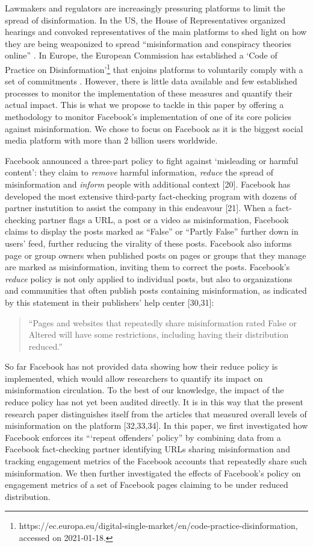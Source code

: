 \documentclass[11pt,a4paper]{article}
\begin{document}
Lawmakers and regulators are increasingly pressuring platforms to limit the spread of disinformation. In the US, the House of Representatives organized hearings and convoked representatives of the main platforms to shed light on how they are being weaponized to spread ``misinformation and conspiracy theories online'' \citep{donovan2020}. In Europe, the European Commission has established a `Code of Practice on Disinformation'\footnote{https://ec.europa.eu/digital-single-market/en/code-practice-disinformation, accessed on 2021-01-18.} that enjoins platforms to voluntarily comply with a set of commitments \citep{heldt2019let}. However, there is little data available and few established processes to monitor the implementation of these measures and quantify their actual impact. This is what we propose to tackle in this paper by offering a methodology to monitor Facebook’s implementation of one of its core policies against misinformation. We chose to focus on Facebook as it is the biggest social media platform with more than 2 billion users worldwide.

Facebook announced a three-part policy to fight against ‘misleading or harmful content’: they claim to \textit{remove} harmful information, \textit{reduce} the spread of misinformation and \textit{inform} people with additional context [20]. Facebook has developed the most extensive third-party fact-checking program with dozens of partner instutition to assist the company in this endeavour [21]. When a fact-checking partner flags a URL, a post or a video as misinformation, Facebook claims to display the posts marked as “False” or “Partly False” further down in users’ feed, further reducing the virality of these posts. Facebook also informs page or group owners when published posts on pages or groups that they manage are marked as misinformation, inviting them to correct the posts. Facebook’s \textit{reduce} policy is not only applied to individual posts, but also to organizations and communities that often publish posts containing misinformation, as indicated by this statement in their publishers’ help center [30,31]: 
\begin{quote}
``Pages and websites that repeatedly share misinformation rated False or Altered will have some restrictions, including having their distribution reduced.''
\end{quote}

So far Facebook has not provided data showing how their reduce policy is implemented, which would allow researchers to quantify its impact on misinformation circulation. To the best of our knowledge, the impact of the reduce policy has not yet been audited directly. It is in this way that the present research paper distinguishes itself from the articles that measured overall levels of misinformation on the platform [32,33,34]. In this paper, we first investigated how Facebook enforces its “‘repeat offenders’ policy” by combining data from a Facebook fact-checking partner identifying URLs sharing misinformation and tracking engagement metrics of the Facebook accounts that repeatedly share such misinformation. We then further investigated the effects of Facebook’s policy on engagement metrics of a set of Facebook pages claiming to be under reduced distribution.
\end{document}
